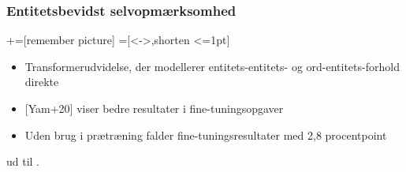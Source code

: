 \documentclass{beamer}
\begin{document}
\begin{frame}
    \frametitle{Entitetsbevidst selvopmærksomhed}
    +=[remember picture]
    =[<->,shorten <=1pt]
    \begin{itemize}
        \item Transformerudvidelse, der modellerer entitets-entitets- og ord-entitets-forhold direkte
        \item{} [Yam+20] viser bedre resultater i fine-tuningsopgaver
        \item Uden brug i prætræning falder fine-tuningsresultater med 2,8 procentpoint
    \end{itemize}
    \begin{example}
        \footnotesize
           ud til .
    \end{example}
\end{frame}
\end{document}
